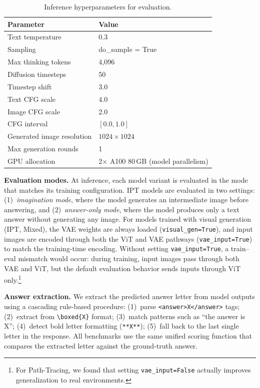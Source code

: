 \begin{table}[h]
\centering
\caption{Inference hyperparameters for evaluation.}
\label{tab:supp_eval_params}
\small
\begin{tabular}{ll}
\toprule
\textbf{Parameter} & \textbf{Value} \\
\midrule
Text temperature & 0.3 \\
Sampling & do\_sample = True \\
Max thinking tokens & 4{,}096 \\
\midrule
Diffusion timesteps & 50 \\
Timestep shift & 3.0 \\
Text CFG scale & 4.0 \\
Image CFG scale & 2.0 \\
CFG interval & $[0.0, 1.0]$ \\
Generated image resolution & $1024 \times 1024$ \\
Max generation rounds & 1 \\
\midrule
GPU allocation & 2$\times$ A100 80\,GB (model parallelism) \\
\bottomrule
\end{tabular}
\end{table}

\noindent\textbf{Evaluation modes.}
At inference, each model variant is evaluated in the mode that matches its training configuration.
IPT models are evaluated in two settings: (1)~\emph{imagination mode}, where the model generates an intermediate image before answering, and (2)~\emph{answer-only mode}, where the model produces only a text answer without generating any image.
For models trained with visual generation (IPT, Mixed), the VAE weights are always loaded (\texttt{visual\_gen=True}), and input images are encoded through both the ViT and VAE pathways (\texttt{vae\_input=True}) to match the training-time encoding.
Without setting \texttt{vae\_input=True}, a train--eval mismatch would occur: during training, input images pass through both VAE and ViT, but the default evaluation behavior sends inputs through ViT only.\footnote{For Path-Tracing, we found that setting \texttt{vae\_input=False} actually improves generalization to real environments.}

\noindent\textbf{Answer extraction.}
We extract the predicted answer letter from model outputs using a cascading rule-based procedure:
(1)~parse \texttt{<answer>X</answer>} tags;
(2)~extract from \texttt{\textbackslash boxed\{X\}} format;
(3)~match patterns such as ``the answer is X'';
(4)~detect bold letter formatting (\texttt{**X**});
(5)~fall back to the last single letter in the response.
All benchmarks use the same unified scoring function that compares the extracted letter against the ground-truth answer.



